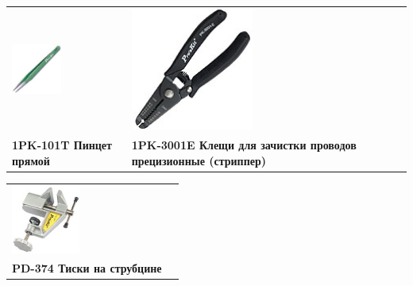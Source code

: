 \begin{tabular}{p{} p{}}
\noindent\includegraphics[width=0.45\textwidth]{tech/tools/proskit/1PK-101T.jpg}
&
\noindent\includegraphics[width=0.45\textwidth]{tech/tools/proskit/1PK-3001E.jpg}
\\
\textbf{1PK-101T Пинцет прямой}
&
\textbf{1PK-3001E Клещи для зачистки проводов прецизионные (стриппер)}
\\
\end{tabular}
\clearpage

\begin{tabular}{p{} p{}}
\noindent\includegraphics[width=0.45\textwidth]{tech/tools/proskit/PD-374.jpg}
&\\
\textbf{PD-374 Тиски на струбцине}
&\\
\end{tabular}
\clearpage

